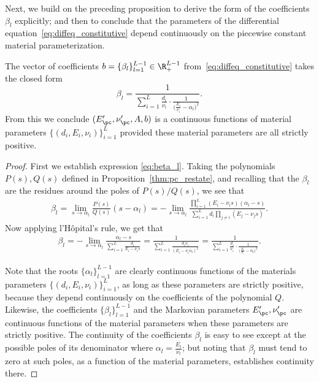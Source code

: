 \documentclass[letterpaper,11pt]{article}
\begin{document}
Next, we build on the preceding proposition to derive the form of the coefficients $\beta_l$ explicitly; and then to conclude that the parameters of the differential equation~\eqref{eq:diffeq_constitutive} depend continuously on the piecewise constant material parameterization.

\begin{theorem}\label{thm:pc_cont}
    The vector of coefficients $b = \{\beta_l\}_{l=1}^{L-1} \in \R_+^{L-1}$ from~\eqref{eq:diffeq_constitutive} takes the closed form
    \begin{equation}\label{eq:beta_l}
        \beta_l = \frac{1}{\sum_{i=1}^L\frac{d_i}{\nu_i} \cdot \frac{1}{\big(\frac{E_i}{\nu_i} - \alpha_l\big)^2}}.
    \end{equation}
    From this we conclude $(E'_{\pc}, \nu'_{\pc}, A, b)$ is a continuous functions of  material parameters $\{(d_i, E_i, \nu_i)\}_{i=1}^L$ provided these material parameters are all strictly positive.
\end{theorem}
\begin{proof}
First we establish expression \eqref{eq:beta_l}. Taking the polynomials $P(s), Q(s)$ defined in Proposition~\ref{thm:pc_restate}, and recalling that the $\beta_l$ are the residues around the poles of $P(s)/Q(s)$, we see that
    \begin{align*}
        \beta_l = \lim_{s \to \alpha_l}\frac{P(s)}{Q(s)}(s - \alpha_l) = -\lim_{s \to \alpha_l} \frac{\prod_{i=1}^L (E_i - \nu_is)(\alpha_l - s)}{\sum_{i=1}^Ld_i\prod_{j \neq i}(E_j - \nu_j s)}.
    \end{align*}
    Now applying l'H\^opital's rule, we get that
    \begin{align*}
        \beta_l = -\lim_{s \to \alpha_l} \frac{\alpha_l - s}{\sum_{i=1}^L\frac{d_i}{E_i - \nu_i s}} = \frac{1}{\sum_{i=1}^L\frac{d_i\nu_i}{(E_i - \nu_i\alpha_l)^2}} = \frac{1}{\sum_{i=1}^L\frac{d_i}{\nu_i} \cdot \frac{1}{\big(\frac{E_i}{\nu_i} - \alpha_l\big)^2}}.
    \end{align*}

    Note that the roots $\{\alpha_l\}_{l=1}^{L-1}$ are clearly continuous functions of the materials parameters $\{(d_i, E_i, \nu_i)\}_{i=1}^L$, as long as these parameters are strictly positive, because they depend continuously on the coefficients of the polynomial $Q$. Likewise, the coefficients $\{\beta_l\}_{l=1}^{L-1}$ and the Markovian parameters $E'_{\pc}, \nu'_{\pc}$ are continuous functions of the material parameters when these parameters are strictly positive. The continuity of the coefficients $\beta_l$ is easy to see except at the possible poles of its denominator where $\alpha_l = \frac{E_l}{\nu_l}$; but noting that $\beta_l$ must tend to zero at such poles, as a function of the material parameters, establishes continuity there.
\end{proof}
\end{document}
